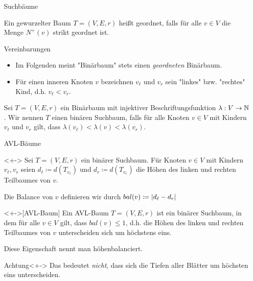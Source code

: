 \begin{frame}{Suchb\"aume}
\begin{definition}
Ein gewurzelter Baum $T = (V, E, r)$ hei{\ss}t \alert{geordnet}, falls f\"ur alle $v \in V$ die Menge $N^+(v)$ strikt geordnet ist.
\end{definition}

\begin{block}{Vereinbarungen}
\begin{itemize}
    \item Im Folgenden meint "Bin\"arbaum" stets einen \emph{geordneten} Bin\"arbaum.
    \item F\"ur einen inneren Knoten $v$ bezeichnen $v_{\ell}$ und $v_r$ sein "linkes" bzw. "rechtes" Kind, d.h. $v_{\ell} < v_r$.
\end{itemize}
\end{block}

\begin{definition}
Sei $T = (V, E, r)$ ein Bin\"arbaum mit injektiver \alert{Beschriftungsfunktion} $\lambda : V \to \mathbb{N}$.
Wir nennen $T$ einen \alert{bin\"aren Suchbaum}, falls f\"ur alle Knoten $v \in V$ mit Kindern $v_{\ell}$ und $v_r$ gilt, dass $\lambda(v_{\ell}) < \lambda(v) < \lambda(v_r)$.
\end{definition}
\end{frame}

\begin{frame}{AVL-B\"aume}
\begin{definition}<+->
Sei $T = (V, E, r)$ ein bin\"arer Suchbaum.
F\"ur Knoten $v \in V$ mit Kindern $v_{\ell}, v_r$ seien $d_{\ell} \coloneqq d(T_{v_{\ell}})$ und $d_r \coloneqq d(T_{v_r})$ die H\"ohen des linken und rechten Teilbaumes von $v$.

Die \alert{Balance} von $v$ definieren wir durch $bal(v) \coloneqq \vert d_{\ell} - d_r\vert$
\end{definition}

\begin{definition}<+->[AVL-Baum]
Ein AVL-Baum $T = (V, E, r)$ ist ein bin\"arer Suchbaum, in dem für alle $v \in V$ gilt, dass $bal(v) \leq 1$, d.h. die H\"ohen des linken und rechten Teilbaumes von $v$ unterscheiden sich um h\"ochstens eins.

Diese Eigenschaft nennt man \alert{höhenbalanciert}.
\end{definition}

\begin{alertblock}{Achtung}<+->
Das bedeutet \emph{nicht}, dass sich die Tiefen aller Bl\"atter um h\"ochsten eins unterscheiden.
\end{alertblock}
\end{frame}


